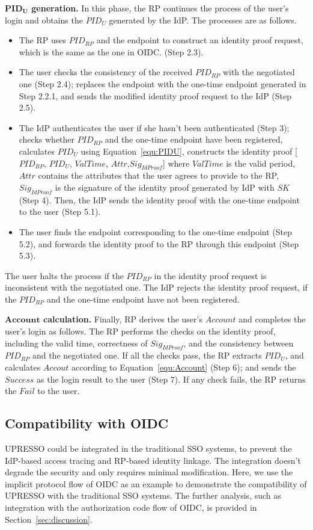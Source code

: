 \vspace{1mm}\noindent\textbf{$\mathbf{PID_U}$ generation.}
In this phase, the RP continues the process of the user's login and obtains the $PID_U$ generated by the IdP. The processes are as follows.
\begin{itemize}
  \item The RP uses $PID_{RP}$ and the endpoint to construct an identity proof request, which is the same as the one in  OIDC. (Step 2.3).
  \item The user checks the consistency of the received $PID_{RP}$  with the negotiated one (Step 2.4); replaces the endpoint with the one-time endpoint generated in Step 2.2.1, and sends the modified identity proof request to the IdP (Step 2.5).
  \item The IdP authenticates the user if she hasn't been authenticated (Step 3); checks whether $PID_{RP}$ and the one-time endpoint have been registered,
   calculates $PID_U$ using Equation~\ref{equ:PIDU},  constructs the identity proof [$PID_{RP}$, $PID_U$, $ValTime$, $Attr$,$Sig_{IdProof}$] where $ValTime$ is the valid period, $Attr$ contains the  attributes that the user agrees to provide to the RP, $Sig_{IdProof}$ is the signature of the identity proof generated by IdP with $SK$ (Step 4). Then, the IdP sends the identity proof with the one-time endpoint to the user (Step 5.1).
  \item The user finds  the  endpoint corresponding to the one-time endpoint (Step 5.2),
   and forwards the identity proof to the RP through this endpoint (Step 5.3).
\end{itemize}
The user halts the process if the $PID_{RP}$ in the identity proof request is inconsistent with  the negotiated one.
The IdP rejects the identity proof request, if the $PID_{RP}$ and the one-time endpoint have not been registered.


\vspace{1mm}\noindent\textbf{$\mathbf{Account}$ calculation.}
Finally, RP derives the user's  $Account$ and completes the user's login as follows. The RP performs the checks on the identity proof, including the valid time, correctness of $Sig_{IdProof}$, and   the consistency between $PID_{RP}$ and the  negotiated one. If all the checks pass, the RP extracts $PID_U$, and calculates $Accout$ according to Equation~\ref{equ:Account} (Step 6); and sends the $Success$ as the login result to the user (Step 7). If any check fails, the RP returns the $Fail$ to the user.


\subsection{Compatibility with OIDC}
\label{subsec:compatible}
UPRESSO could be integrated in the traditional SSO systems, to  prevent the IdP-based access tracing and RP-based identity linkage.
The integration doesn't degrade the security and only requires minimal modification.
Here, we use the implicit protocol flow of OIDC as an example to demonstrate the compatibility of UPRESSO with the traditional SSO systems.
The further analysis, such as integration with the authorization code flow of OIDC,  is provided in Section~\ref{sec:discussion}.


